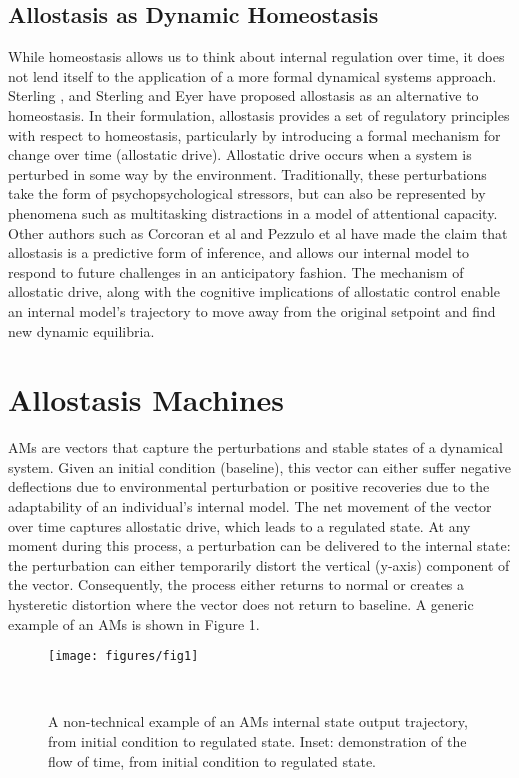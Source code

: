 \documentclass{sigchi}
\begin{document}
\subsection{Allostasis as Dynamic Homeostasis}
While homeostasis allows us to think about internal regulation over time, it does not lend itself to the application of a more formal dynamical systems approach. Sterling \cite{sterling}, \cite{sterling:allostasis} and Sterling and Eyer \cite{fisher:newparadigm} have proposed allostasis as an alternative to homeostasis. In their formulation, allostasis provides a set of regulatory principles with respect to homeostasis, particularly by introducing a formal mechanism for change over time (allostatic drive). Allostatic drive occurs when a system is perturbed in some way by the environment. Traditionally, these perturbations take the form of psychopsychological stressors, but can also be represented by phenomena such as multitasking distractions in a model of attentional capacity. Other authors such as Corcoran et al \cite{corcoran} and Pezzulo et al \cite{pezzulo} have made the claim that allostasis is a predictive form of inference, and allows our internal model to respond to future challenges in an anticipatory fashion. The mechanism of allostatic drive, along with the cognitive implications of allostatic control enable an internal model’s trajectory to move away from the original setpoint and find new dynamic equilibria.


\section{Allostasis Machines}

AMs are vectors that capture the perturbations and stable states of a dynamical system. Given an initial condition (baseline), this vector can either suffer negative deflections due to environmental perturbation or positive recoveries due to the adaptability of an individual’s internal model. The net movement of the vector over time captures allostatic drive, which leads to a regulated state. At any moment during this process, a perturbation can be delivered to the internal state: the perturbation can either temporarily distort the vertical (y-axis) component of the vector. Consequently, the process either returns to normal or creates a hysteretic distortion where the vector does not return to baseline. A generic example of an AMs is shown in Figure 1.\\
\begin{figure}[h]
\centering
  \texttt{[image: figures/fig1]}
  \caption{A non-technical example of an AMs internal state output trajectory, from initial condition to regulated state. Inset: demonstration of the flow of time, from initial condition to regulated state. }~\label{fig:figure1}
\end{figure}
\end{document}
